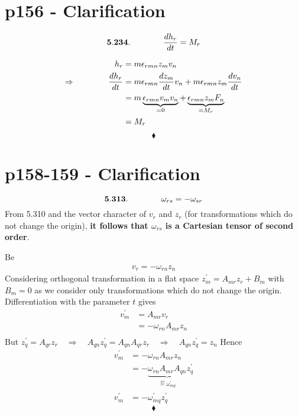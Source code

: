 \section{p156 - Clarification}
\begin{tcolorbox}
$$\mathbf{5.234.}\quad\quad\quad\quad \dv{h_r}{t}= M_r$$
\end{tcolorbox}
\begin{align}
h_r &= m\epsilon_{rmn}z_mv_n\\
\Rightarrow \quad\quad\quad\quad \dv{h_r}{t} &= m\epsilon_{rmn}\dv{z_m}{t} v_n+m\epsilon_{rmn}z_m\dv{v_n}{t}\\
&= m\underbrace{\epsilon_{rmn}v_m v_n}_{=0}+\underbrace{\epsilon_{rmn}z_mF_n}_{=M_r}\\
&=M_r
\end{align}
$$\blacklozenge$$
\newpage



\section{p158-159 - Clarification}
\begin{tcolorbox}
$$\mathbf{5.313.}\quad\quad\quad\quad \omega_{rs}= -\omega_{sr}$$ From 5.310 and the vector character of $v_r$ and $z_r$ (for transformations which do not change the origin), \textbf{it follows that $\omega_{rs} $ is a Cartesian tensor of second order}.
\end{tcolorbox}
Be 
\begin{align}
v^{}_r = -\omega^{}_{rn}z^{}_n
\end{align}
Considering orthogonal transformation in a flat space $z^{'}_m = A_{mr}z^{}_r+B_m$ with  $B_m=0$ as we consider only transformations which do not change the origin. Differentiation with the parameter $t$ gives 
\begin{align}
v^{'}_m &= A_{mr}v^{}_r\\
&= -\omega^{}_{rn}A_{mr}z^{}_n\\
\end{align}
But $z^{'}_q = A_{qr}z^{}_r\quad\Rightarrow \quad A_{qn}z^{'}_q = A_{qn}A_{qr}z^{}_r\quad\Rightarrow \quad A_{qn}z^{'}_q = z^{}_n$ 
Hence
\begin{align}
v^{'}_m &= -\omega^{}_{rn}A_{mr}z^{}_n\\
&= -\underbrace{\omega^{}_{rn}A_{mr}A_{qn}}_{\overset{\underset{\mathrm{def}}{}}{=}\omega_{mq}^{'}}z^{'}_q\\
v^{'}_m &= -\omega_{mq}^{'}z^{'}_q
\end{align}
$$\blacklozenge$$
\newpage


